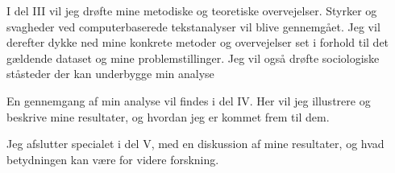 I del III vil jeg drøfte mine metodiske og teoretiske overvejelser.
Styrker og svagheder ved computerbaserede tekstanalyser vil blive gennemgået. Jeg vil derefter dykke ned mine konkrete metoder og overvejelser set i forhold til det gældende dataset og mine problemstillinger.
Jeg vil også drøfte sociologiske ståsteder der kan underbygge min analyse 

En gennemgang af min analyse vil findes i del IV.
Her vil jeg illustrere og beskrive mine resultater, og hvordan jeg er kommet frem til dem.

Jeg afslutter specialet i del V, med en diskussion af mine resultater, og hvad betydningen kan være for videre forskning.
